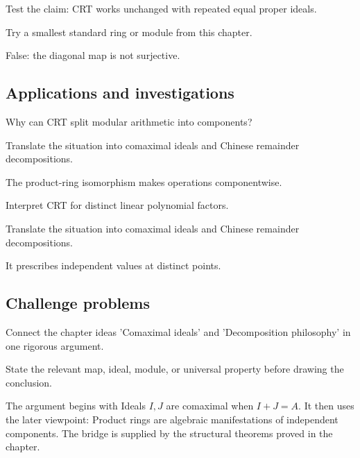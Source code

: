 \begin{exercise}\label{exr:v04-expand-12}
Test the claim: CRT works unchanged with repeated equal proper ideals.
\end{exercise}
\begin{hint}
Try a smallest standard ring or module from this chapter.
\end{hint}
\begin{solution}
False: the diagonal map is not surjective.
\end{solution}

\subsection*{Applications and investigations}

\begin{exercise}\label{exr:v04-expand-13}
Why can CRT split modular arithmetic into components?
\end{exercise}
\begin{hint}
Translate the situation into comaximal ideals and Chinese remainder decompositions.
\end{hint}
\begin{solution}
The product-ring isomorphism makes operations componentwise.
\end{solution}

\begin{exercise}[Interpolation]\label{exr:v04-expand-14}
Interpret CRT for distinct linear polynomial factors.
\end{exercise}
\begin{hint}
Translate the situation into comaximal ideals and Chinese remainder decompositions.
\end{hint}
\begin{solution}
It prescribes independent values at distinct points.
\end{solution}

\subsection*{Challenge problems}

\begin{exercise}\label{exr:v04-expand-15}
Connect the chapter ideas 'Comaximal ideals' and 'Decomposition philosophy' in one rigorous argument.
\end{exercise}
\begin{hint}
State the relevant map, ideal, module, or universal property before drawing the conclusion.
\end{hint}
\begin{solution}
The argument begins with Ideals $I,J$ are comaximal when $I+J=A$. It then uses the later viewpoint: Product rings are algebraic manifestations of independent components. The bridge is supplied by the structural theorems proved in the chapter.
\end{solution}


